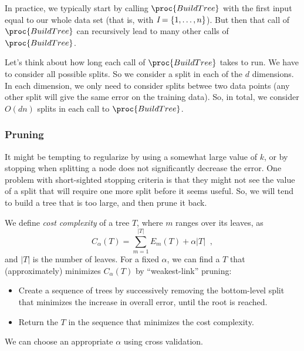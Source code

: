 In practice, we typically start by calling $\proc{BuildTree}$ with the first
input equal to our
whole data set (that is, with ${\emph I} = \{1,\ldots,n\}$). But then that
call of $\proc{BuildTree}$ can recursively lead to many other calls
of $\proc{BuildTree}$.

Let's think about how long each call of $\proc{BuildTree}$ takes to
run. We have to consider all possible splits. So we consider a split
in each of the $d$ dimensions. In each dimension, we only need to
consider splits betwee two data points (any other split will give the
same error on the training data). So, in total, we consider $O(d n)$
splits in each call to $\proc{BuildTree}$.

\subsubsection{Pruning}
It might be tempting to regularize by using a somewhat large
value of $k$, or by stopping when splitting a node does not significantly
decrease the error.  One problem with short-sighted stopping criteria
is that they might not see the value of a split that will require one
more split before it seems useful.
So, we will tend to build a tree that is too large, and then prune it
back.

We define {\em cost complexity} of a
tree $T$, where $m$ ranges over its leaves, as
\begin{equation}
  C_\alpha(T) = \sum_{m = 1}^{|T|} E_m(T) + \alpha |T|\;\;,
\end{equation}
and $|T|$ is the number of leaves.
For a fixed $\alpha$, we can find a $T$ that (approximately) minimizes
$C_\alpha(T)$ by ``weakest-link'' pruning:
\begin{itemize}
  \item Create a sequence of trees by successively removing the
        bottom-level split that minimizes the increase in overall error,
        until the root is reached.
  \item Return the $T$ in the sequence that minimizes the cost complexity.
\end{itemize}
We can choose an appropriate $\alpha$ using cross validation.

